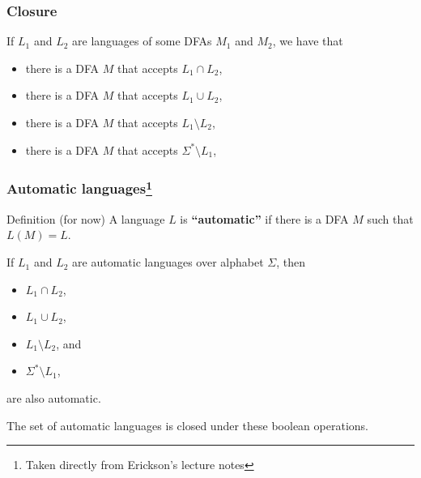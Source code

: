 \begin{frame}

  \frametitle{Closure}

  \begin{lemma}
    If $L_1$ and $L_2$ are languages of some DFAs $M_1$ and $M_2$,
    we have that
    \begin{itemize}
    \item there is a DFA $M$ that accepts $L_1\cap L_2$, \pause
    \item there is a DFA $M$ that accepts $L_1\cup L_2$, \pause
    \item there is a DFA $M$ that accepts $L_1\setminus L_2$, \pause
    \item there is a DFA $M$ that accepts $\Sigma^* \setminus L_1$,
    \end{itemize}
  \end{lemma}
  
\end{frame}

\begin{frame}

  \frametitle{Automatic languages\footnote{Taken directly from Erickson's lecture notes}}

  \begin{block}{Definition (for now)}
    A language $L$ is {\color{red}\bf ``automatic''} if there is a DFA $M$
    such that $L(M)=L$.
  \end{block}

  \pause

  \begin{lemma}
    If $L_1$ and $L_2$ are automatic languages over alphabet $\Sigma$,
    then
    \begin{itemize}
    \item $L_1\cap L_2$, \pause
    \item $L_1\cup L_2$, \pause
    \item $L_1\setminus L_2$, and \pause
    \item $\Sigma^* \setminus L_1$,
    \end{itemize}
    are also automatic.
  \end{lemma}

  \pause

  The set of automatic languages is closed under these boolean
  operations.
  
\end{frame}

